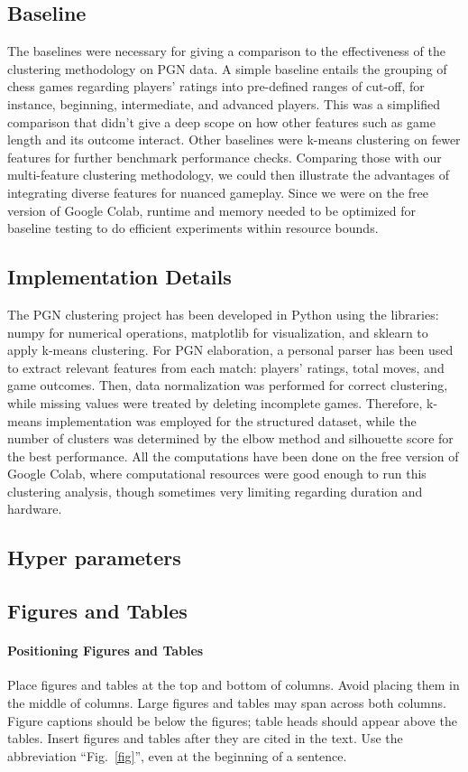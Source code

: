 \documentclass[conference]{IEEEtran}
\begin{document}
\subsection{Baseline}
The baselines were necessary for giving a comparison to the effectiveness of the clustering methodology on PGN data. A simple baseline entails the grouping of chess games regarding players' ratings into pre-defined ranges of cut-off, for instance, beginning, intermediate, and advanced players. This was a simplified comparison that didn't give a deep scope on how other features such as game length and its outcome interact. Other baselines were k-means clustering on fewer features for further benchmark performance checks. Comparing those with our multi-feature clustering methodology, we could then illustrate the advantages of integrating diverse features for nuanced gameplay. Since we were on the free version of Google Colab, runtime and memory needed to be optimized for baseline testing to do efficient experiments within resource bounds.

\subsection{Implementation Details}
The PGN clustering project has been developed in Python using the libraries: numpy for numerical operations, matplotlib for visualization, and sklearn to apply k-means clustering. For PGN elaboration, a personal parser has been used to extract relevant features from each match: players' ratings, total moves, and game outcomes. Then, data normalization was performed for correct clustering, while missing values were treated by deleting incomplete games. Therefore, k-means implementation was employed for the structured dataset, while the number of clusters was determined by the elbow method and silhouette score for the best performance. All the computations have been done on the free version of Google Colab, where computational resources were good enough to run this clustering analysis, though sometimes very limiting regarding duration and hardware.

\subsection{Hyper parameters}

\subsection{Figures and Tables}\label{}
\paragraph{Positioning Figures and Tables} Place figures and tables at the top and 
bottom of columns. Avoid placing them in the middle of columns. Large 
figures and tables may span across both columns. Figure captions should be 
below the figures; table heads should appear above the tables. Insert 
figures and tables after they are cited in the text. Use the abbreviation 
``Fig.~\ref{fig}'', even at the beginning of a sentence.
\end{document}
